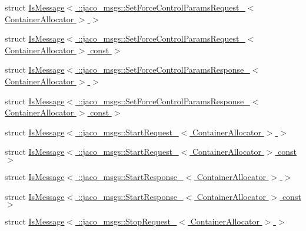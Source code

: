 \begin{DoxyCompactItemize}
\item 
struct \hyperlink{structros_1_1message__traits_1_1IsMessage_3_01_1_1jaco__msgs_1_1SetForceControlParamsRequest___3_01ContainerAllocator_01_4_01_4}{Is\+Message$<$ \+::jaco\+\_\+msgs\+::\+Set\+Force\+Control\+Params\+Request\+\_\+$<$ Container\+Allocator $>$ $>$}
\item 
struct \hyperlink{structros_1_1message__traits_1_1IsMessage_3_01_1_1jaco__msgs_1_1SetForceControlParamsRequest___36dfc005745f617550309adf362f6b717}{Is\+Message$<$ \+::jaco\+\_\+msgs\+::\+Set\+Force\+Control\+Params\+Request\+\_\+$<$ Container\+Allocator $>$ const  $>$}
\item 
struct \hyperlink{structros_1_1message__traits_1_1IsMessage_3_01_1_1jaco__msgs_1_1SetForceControlParamsResponse___e75409f12a4732c09eeb8d293efb6faf}{Is\+Message$<$ \+::jaco\+\_\+msgs\+::\+Set\+Force\+Control\+Params\+Response\+\_\+$<$ Container\+Allocator $>$ $>$}
\item 
struct \hyperlink{structros_1_1message__traits_1_1IsMessage_3_01_1_1jaco__msgs_1_1SetForceControlParamsResponse___7f6f76d7d541d1511bf9768100124dcb}{Is\+Message$<$ \+::jaco\+\_\+msgs\+::\+Set\+Force\+Control\+Params\+Response\+\_\+$<$ Container\+Allocator $>$ const  $>$}
\item 
struct \hyperlink{structros_1_1message__traits_1_1IsMessage_3_01_1_1jaco__msgs_1_1StartRequest___3_01ContainerAllocator_01_4_01_4}{Is\+Message$<$ \+::jaco\+\_\+msgs\+::\+Start\+Request\+\_\+$<$ Container\+Allocator $>$ $>$}
\item 
struct \hyperlink{structros_1_1message__traits_1_1IsMessage_3_01_1_1jaco__msgs_1_1StartRequest___3_01ContainerAllocator_01_4_01const_01_01_4}{Is\+Message$<$ \+::jaco\+\_\+msgs\+::\+Start\+Request\+\_\+$<$ Container\+Allocator $>$ const  $>$}
\item 
struct \hyperlink{structros_1_1message__traits_1_1IsMessage_3_01_1_1jaco__msgs_1_1StartResponse___3_01ContainerAllocator_01_4_01_4}{Is\+Message$<$ \+::jaco\+\_\+msgs\+::\+Start\+Response\+\_\+$<$ Container\+Allocator $>$ $>$}
\item 
struct \hyperlink{structros_1_1message__traits_1_1IsMessage_3_01_1_1jaco__msgs_1_1StartResponse___3_01ContainerAllocator_01_4_01const_01_01_4}{Is\+Message$<$ \+::jaco\+\_\+msgs\+::\+Start\+Response\+\_\+$<$ Container\+Allocator $>$ const  $>$}
\item 
struct \hyperlink{structros_1_1message__traits_1_1IsMessage_3_01_1_1jaco__msgs_1_1StopRequest___3_01ContainerAllocator_01_4_01_4}{Is\+Message$<$ \+::jaco\+\_\+msgs\+::\+Stop\+Request\+\_\+$<$ Container\+Allocator $>$ $>$}

\end{DoxyCompactItemize}

